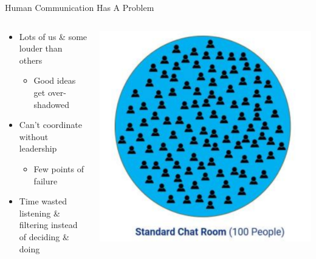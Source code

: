 \documentclass[aspectratio=169]{beamer}
\begin{document}
\begin{frame}{Human Communication Has A Problem}
\begin{columns}[T]
    \begin{column}[T]{0.5\textwidth}
        \begin{itemize}
            \item Lots of us \& some louder than others
            \begin{itemize}
                \item Good ideas get over-shadowed
            \end{itemize}
            \item Can't coordinate without leadership
            \begin{itemize}
                \item Few points of failure
            \end{itemize}
            \item Time wasted listening \& filtering instead of deciding \& doing
        \end{itemize}
    \end{column}
    \begin{column}{0.5\textwidth}
        \includegraphics[height=0.8\textheight]{imgs/CSI_section/standard_chat_room.png}
    \end{column}
\end{columns}
\end{frame}
\end{document}
